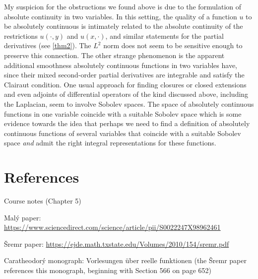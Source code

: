 \documentclass[11pt,leqno]{article}
\theoremstyle{plain}
\theoremstyle{definition}
\numberwithin{equation}{section}
\numberwithin{lem}{section}
\begin{document}
My suspicion for the obstructions we found above is due to the formulation of absolute continuity in two variables. In this setting, the quality of a function $u$ to be absolutely continuous is intimately related to the absolute continuity of the restrictions $u(\cdot,y)$ and $u(x,\cdot)$, and similar statements for the partial derivatives (see \cref{thm2}). The $L^2$ norm does not seem to be sensitive enough to preserve this connection. The other strange phenomenon is the apparent additional smoothness absolutely continuous functions in two variables have, since their mixed second-order partial derivatives are integrable and satisfy the Clairaut condition. One usual approach for finding closures or closed extensions and even adjoints of differential operators of the kind discussed above, including the Laplacian, seem to involve Sobolev spaces. The space of absolutely continuous functions in one variable coincide with a suitable Sobolev space which is some evidence towards the idea that perhaps we need to find a definition of absolutely continuous functions of several variables that coincide with a suitable Sobolev space \textit{and} admit the right integral representations for these functions.
\newpage
\section*{References}
Course notes (Chapter 5)

Mal\'y paper: \href{https://www.sciencedirect.com/science/article/pii/S0022247X98962461}{https://www.sciencedirect.com/science/article/pii/S0022247X98962461}

\v Sremr paper: \href{https://ejde.math.txstate.edu/Volumes/2010/154/sremr.pdf}{https://ejde.math.txstate.edu/Volumes/2010/154/sremr.pdf}

Caratheodor\'y monograph: Vorlesungen über reelle funktionen (the \v Sremr paper references this monograph, beginning with Section 566 on page 652)
\end{document}
